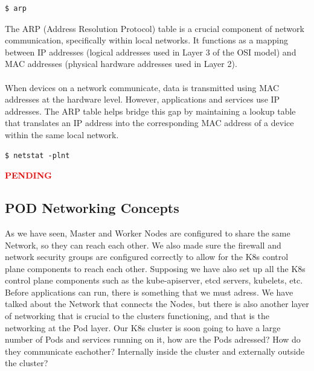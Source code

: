 \documentclass{article}
\newenvironment{blocktemplateII}[1]{%
    \tcolorbox[beamer,%
    noparskip,breakable,
    colframe=Green,%
    colbacklower=LimeGreen!75!LightGreen,%
    title=#1]}%
    {\endtcolorbox}
\newenvironment{codetemplate}[1][]{%
  \mybasecolorbox[#1]
  \itshape
}{%
  \endmybasecolorbox
}
\begin{document}
\begin{codetemplate}{}
\begin{verbatim}
$ arp
\end{verbatim}
\end{codetemplate}

\begin{blocktemplateII}{NOTE}
The ARP (Address Resolution Protocol) table is a crucial component of network communication, specifically within local networks. It functions as a mapping between IP addresses (logical addresses used in Layer 3 of the OSI model) and MAC addresses (physical hardware addresses used in Layer 2).
\\\\
When devices on a network communicate, data is transmitted using MAC addresses at the hardware level. However, applications and services use IP addresses. The ARP table helps bridge this gap by maintaining a lookup table that translates an IP address into the corresponding MAC address of a device within the same local network.
\end{blocktemplateII}

\begin{codetemplate}{}
\begin{verbatim}
$ netstat -plnt
\end{verbatim}
\end{codetemplate}

\textcolor{red}{\textbf{PENDING}}

\subsection{POD Networking Concepts}

As we have seen, Master and Worker Nodes are configured to share the same Network, so they can reach each other. We also made sure the firewall and network security groups are configured correctly to allow for the K8s control plane components to reach each other. Supposing we have also set up all the K8s control plane components such as the kube-apiserver, etcd servers, kubelets, etc. Before applications can run, there is something that we must adress. We have talked about the Network that connects the Nodes,  but there is also another layer of networking that is crucial to the clusters functioning, and that is the networking at the Pod layer. Our K8s cluster is soon going to have a large number of Pods and services running on it, how are the Pods adressed? How do they communicate eachother? Internally inside the cluster and externally outside the cluster?
\end{document}
